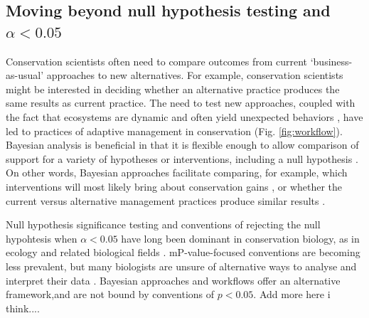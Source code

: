 \documentclass{article}
\begin{document}
\subsection*{Moving beyond null hypothesis testing and $\alpha <0.05$ }
\par Conservation scientists often need to compare outcomes from current `business-as-usual' approaches to new alternatives. For example, conservation scientists might be interested in deciding whether an alternative practice produces the same results as current practice. 
The need to test new approaches, coupled with the fact that ecosystems are dynamic and often yield unexpected behaviors \citep{Levin2012,Gross2013}, have led to practices of adaptive management in conservation \citep{holling1978adaptive} (Fig. \ref{fig:workflow}). %
Bayesian analysis is beneficial in that it is flexible enough to allow comparison of support for a variety of hypotheses or interventions, including a null hypothesis \citep{Zyl2018}. On other words, Bayesian approaches facilitate comparing, for example, which interventions will most likely bring about conservation gains \citep{prato2005bayesian}, or whether the current versus alternative management practices produce similar results \citep{gallistel2009importance}.

\par Null hypothesis significance testing and conventions of rejecting the null hypohtesis when $\alpha <0.05$ have long been dominant in conservation biology, as in ecology and related biological fields \citep[e.g., ecotoxicaology][]{erickson2020moving}. mP-value-focused conventions are becoming less prevalent, but many biologists are unsure of alternative ways to analyse and interpret their data \citep{halsey2019reign}. Bayesian approaches and workflows offer an alternative framework,and are not bound by conventions of $p<0.05$. Add more here i think....
\end{document}
